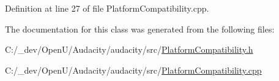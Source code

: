 Definition at line 27 of file Platform\+Compatibility.\+cpp.



The documentation for this class was generated from the following files\+:\begin{DoxyCompactItemize}
\item 
C\+:/\+\_\+dev/\+Open\+U/\+Audacity/audacity/src/\hyperlink{_platform_compatibility_8h}{Platform\+Compatibility.\+h}\item 
C\+:/\+\_\+dev/\+Open\+U/\+Audacity/audacity/src/\hyperlink{_platform_compatibility_8cpp}{Platform\+Compatibility.\+cpp}\end{DoxyCompactItemize}
